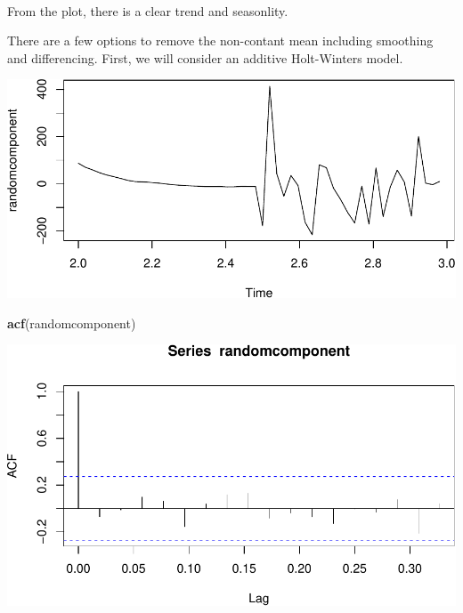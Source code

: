 \documentclass[]{article}
\newenvironment{Shaded}{\begin{snugshade}}{\end{snugshade}}
\newcommand{\DataTypeTok}[1]{\textcolor[rgb]{0.13,0.29,0.53}{#1}}
\newcommand{\DecValTok}[1]{\textcolor[rgb]{0.00,0.00,0.81}{#1}}
\newcommand{\KeywordTok}[1]{\textcolor[rgb]{0.13,0.29,0.53}{\textbf{#1}}}
\newcommand{\NormalTok}[1]{#1}
\newcommand{\OperatorTok}[1]{\textcolor[rgb]{0.81,0.36,0.00}{\textbf{#1}}}
\newcommand{\StringTok}[1]{\textcolor[rgb]{0.31,0.60,0.02}{#1}}
\begin{document}
\(\;\)

From the plot, there is a clear trend and seasonlity.

There are a few options to remove the non-contant mean including
smoothing and differencing. First, we will consider an additive
Holt-Winters model.

\begin{Shaded}
\end{Shaded}

\begin{center}\includegraphics{bookings_forecast_files/figure-latex/unnamed-chunk-5-1} \end{center}

\begin{Shaded}
\begin{Highlighting}[]
\KeywordTok{acf}\NormalTok{(randomcomponent)}
\end{Highlighting}
\end{Shaded}

\begin{center}\includegraphics{bookings_forecast_files/figure-latex/unnamed-chunk-5-2} \end{center}
\end{document}

